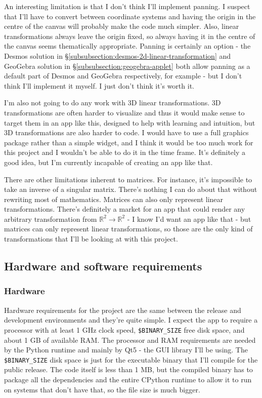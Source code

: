 \documentclass[../main.tex]{subfiles}
\begin{document}
An interesting limitation is that I don't think I'll implement panning. I suspect that I'll have to convert between coordinate systems and having the origin in the centre of the canvas will probably make the code much simpler. Also, linear transformations always leave the origin fixed, so always having it in the centre of the canvas seems thematically appropriate. Panning is certainly an option - the Desmos solution in \S\ref{subsubsection:desmos-2d-linear-transformation} and GeoGebra solution in \S\ref{subsubsection:geogebra-applet} both allow panning as a default part of Desmos and GeoGebra respectively, for example - but I don't think I'll implement it myself. I just don't think it's worth it.

I'm also not going to do any work with 3D linear transformations. 3D transformations are often harder to visualize and thus it would make sense to target them in an app like this, designed to help with learning and intuition, but 3D transformations are also harder to code. I would have to use a full graphics package rather than a simple widget, and I think it would be too much work for this project and I wouldn't be able to do it in the time frame. It's definitely a good idea, but I'm currently incapable of creating an app like that.

There are other limitations inherent to matrices. For instance, it's impossible to take an inverse of a singular matrix. There's nothing I can do about that without rewriting most of mathematics. Matrices can also only represent linear transformations. There's definitely a market for an app that could render any arbitrary transformation from $\mathbb{R}^2 \to \mathbb{R}^2$ - I know I'd want an app like that - but matrices can only represent linear transformations, so those are the only kind of transformations that I'll be looking at with this project.

\subsection{Hardware and software requirements\label{subsection:hardware-and-software-requirements}}

\subsubsection{Hardware\label{subsubsection:hardware}}


Hardware requirements for the project are the same between the release and development environments and they're quite simple. I expect the app to require a processor with at least 1 GHz clock speed, \texttt{\$BINARY\_SIZE} free disk space, and about 1 GB of available RAM. The processor and RAM requirements are needed by the Python runtime and mainly by Qt5 - the GUI library I'll be using. The \texttt{\$BINARY\_SIZE} disk space is just for the executable binary that I'll compile for the public release. The code itself is less than 1 MB, but the compiled binary has to package all the dependencies and the entire CPython runtime to allow it to run on systems that don't have that, so the file size is much bigger.
\end{document}
